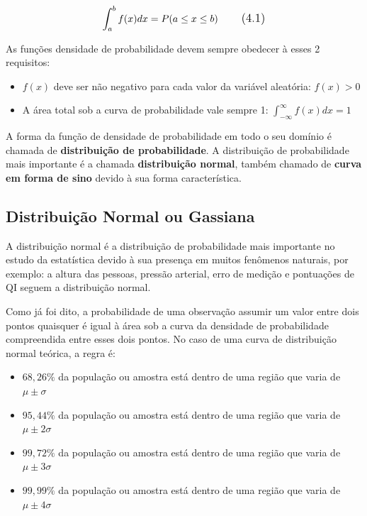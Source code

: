\begin{equation}
\large \int_{a}^{b} f(x)dx = P(a\leq x\leq b)
\tag{4.1}
\end{equation}

As funções densidade de probabilidade devem sempre obedecer à esses 2 requisitos:
\begin{itemize}
\item $f(x)$ deve ser não negativo para cada valor da variável aleatória: $f(x) > 0$
\item A área total sob a curva de probabilidade vale sempre 1: $\int_{-\infty }^{\infty} f(x)dx = 1$
\end{itemize}

A forma da função de densidade de probabilidade em todo o seu domínio é chamada de \textbf{distribuição de probabilidade}. A distribuição de probabilidade mais importante é a chamada \textbf{distribuição normal}, também chamado de \textbf{curva em forma de sino} devido à sua forma característica.

\subsection{Distribuição Normal ou Gassiana}

A distribuição normal é a distribuição de probabilidade mais importante no estudo da estatística devido à sua presença em muitos fenômenos naturais, por exemplo: a altura das pessoas, pressão arterial, erro de medição e pontuações de QI seguem a distribuição normal.

Como já foi dito, a probabilidade de uma observação assumir um valor entre dois pontos quaisquer é igual à área sob a curva da densidade de probabilidade compreendida entre esses dois pontos. No caso de uma curva de distribuição normal teórica, a regra é: 

\begin{itemize} 

\item $68,26\%$ da população ou amostra está dentro de uma região que varia de $\mu \pm \sigma$ 
\item $95,44\%$ da população ou amostra está dentro de uma região que varia de $\mu \pm 2\sigma$
\item $99,72\%$ da população ou amostra está dentro de uma região que varia de $\mu \pm 3\sigma$
\item $99,99\%$ da população ou amostra está dentro de uma região que varia de $\mu \pm 4\sigma$ 

\end{itemize}

